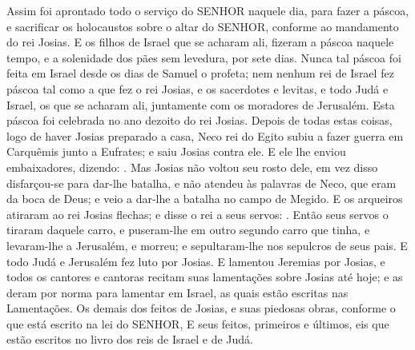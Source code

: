 {  Assim foi aprontado todo o serviço do SENHOR naquele dia, para fazer a páscoa, e sacrificar os holocaustos sobre o altar do SENHOR, conforme ao mandamento do rei Josias. %
  E os filhos de Israel que se acharam ali, fizeram a páscoa naquele tempo, e a solenidade dos pães sem levedura, por sete dias.
  Nunca tal páscoa foi feita em Israel desde os dias de Samuel o profeta; nem nenhum rei de Israel fez páscoa tal como a que fez o rei Josias, e os sacerdotes e levitas, e todo Judá e Israel, os que se acharam ali, juntamente com os moradores de Jerusalém.
  Esta páscoa foi celebrada no ano dezoito do rei Josias.
  Depois de todas estas coisas, logo de haver Josias preparado a casa, Neco rei do Egito subiu a fazer guerra em Carquêmis junto a Eufrates; e saiu Josias contra ele.
  E ele lhe enviou embaixadores, dizendo: .
  Mas Josias não voltou seu rosto dele, em vez disso disfarçou-se para dar-lhe batalha, e não atendeu às palavras de Neco, que eram da boca de Deus; e veio a dar-lhe a batalha no campo de Megido.
  E os arqueiros atiraram ao rei Josias flechas; e disse o rei a seus servos: .
  Então seus servos o tiraram daquele carro, e puseram-lhe em outro segundo carro que tinha, e levaram-lhe a Jerusalém, e morreu; e sepultaram-lhe nos sepulcros de seus pais. E todo Judá e Jerusalém fez luto por Josias.
  E lamentou Jeremias por Josias, e todos os cantores e cantoras recitam suas lamentações sobre Josias até hoje; e as deram por norma para lamentar em Israel, as quais estão escritas nas Lamentações.
  Os demais dos feitos de Josias, e suas piedosas obras, conforme o que está escrito na lei do SENHOR,
  E seus feitos, primeiros e últimos, eis que estão escritos no livro dos reis de Israel e de Judá.
\par }

